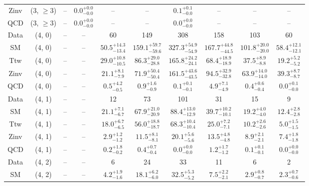 \begin{table}[h!]
{\begin{tabular}{cccccccccc}
	Zinv & (3, $\ge3$) & -- & $0.0^{+ 0.0 }_{- 0.0 }$ & -- & -- & $0.1^{+ 0.1 }_{- 0.0 }$ & -- & -- & -- \\[0.5ex] 
	QCD & (3, $\ge3$) & -- & $0.0^{+ 0.0 }_{- 0.0 }$ & -- & -- & $0.0^{+ 0.0 }_{- 0.0 }$ & -- & -- & -- \\[0.5ex] 
	Data & (4, 0) & -- & -- & 60 & 149 & 308 & 158 & 103 & 60 \\[0.5ex] 
	SM & (4, 0) & -- & -- & $50.5^{+ 14.3 }_{- 13.4 }$ & $159.1^{+ 59.7 }_{- 59.6 }$ & $327.3^{+ 54.9 }_{- 54.9 }$ & $167.7^{+ 44.8 }_{- 44.5 }$ & $101.8^{+ 20.0 }_{- 20.0 }$ & $58.4^{+ 12.1 }_{- 12.1 }$ \\[0.5ex] 
	Ttw & (4, 0) & -- & -- & $29.0^{+ 10.8 }_{- 10.5 }$ & $86.3^{+ 29.0 }_{- 28.8 }$ & $165.8^{+ 24.2 }_{- 24.1 }$ & $68.4^{+ 18.9 }_{- 18.9 }$ & $37.5^{+ 8.9 }_{- 8.8 }$ & $19.2^{+ 5.2 }_{- 5.2 }$ \\[0.5ex] 
	Zinv & (4, 0) & -- & -- & $21.1^{+ 8.1 }_{- 7.9 }$ & $71.9^{+ 50.4 }_{- 50.4 }$ & $161.5^{+ 43.6 }_{- 43.5 }$ & $94.5^{+ 32.9 }_{- 32.8 }$ & $63.9^{+ 14.0 }_{- 14.0 }$ & $39.3^{+ 8.7 }_{- 8.7 }$ \\[0.5ex] 
	QCD & (4, 0) & -- & -- & $0.5^{+ 4.2 }_{- 0.5 }$ & $0.9^{+ 1.6 }_{- 0.9 }$ & $0.1^{+ 0.1 }_{- 0.1 }$ & $4.9^{+ 7.1 }_{- 4.9 }$ & $0.4^{+ 0.6 }_{- 0.4 }$ & $0.0^{+ 0.1 }_{- 0.0 }$ \\[0.5ex] 
	Data & (4, 1) & -- & -- & 12 & 73 & 101 & 31 & 15 & 9 \\[0.5ex] 
	SM & (4, 1) & -- & -- & $21.1^{+ 7.1 }_{- 6.7 }$ & $67.9^{+ 21.0 }_{- 20.9 }$ & $88.4^{+ 13.0 }_{- 12.9 }$ & $39.7^{+ 10.2 }_{- 10.1 }$ & $19.2^{+ 4.0 }_{- 4.0 }$ & $12.4^{+ 2.8 }_{- 2.8 }$ \\[0.5ex] 
	Ttw & (4, 1) & -- & -- & $18.0^{+ 6.7 }_{- 6.5 }$ & $56.0^{+ 18.8 }_{- 18.7 }$ & $68.3^{+ 10.4 }_{- 10.4 }$ & $25.0^{+ 7.2 }_{- 7.1 }$ & $10.2^{+ 2.6 }_{- 2.6 }$ & $5.0^{+ 1.5 }_{- 1.5 }$ \\[0.5ex] 
	Zinv & (4, 1) & -- & -- & $2.9^{+ 1.2 }_{- 1.2 }$ & $11.5^{+ 8.1 }_{- 8.1 }$ & $20.1^{+ 5.6 }_{- 5.6 }$ & $13.5^{+ 4.8 }_{- 4.8 }$ & $8.9^{+ 2.1 }_{- 2.1 }$ & $7.4^{+ 1.8 }_{- 1.8 }$ \\[0.5ex] 
	QCD & (4, 1) & -- & -- & $0.2^{+ 1.8 }_{- 0.2 }$ & $0.4^{+ 0.7 }_{- 0.4 }$ & $0.0^{+ 0.0 }_{- 0.0 }$ & $1.2^{+ 1.7 }_{- 1.2 }$ & $0.1^{+ 0.1 }_{- 0.1 }$ & $0.0^{+ 0.0 }_{- 0.0 }$ \\[0.5ex] 
	Data & (4, 2) & -- & -- & 6 & 24 & 33 & 11 & 6 & 2 \\[0.5ex] 
	SM & (4, 2) & -- & -- & $4.2^{+ 1.9 }_{- 1.6 }$ & $18.1^{+ 6.2 }_{- 6.0 }$ & $32.5^{+ 5.3 }_{- 5.2 }$ & $7.5^{+ 2.2 }_{- 2.1 }$ & $2.9^{+ 0.8 }_{- 0.7 }$ & $2.3^{+ 0.7 }_{- 0.6 }$ \\[0.5ex] 

\end{tabular}}
\end{table}
